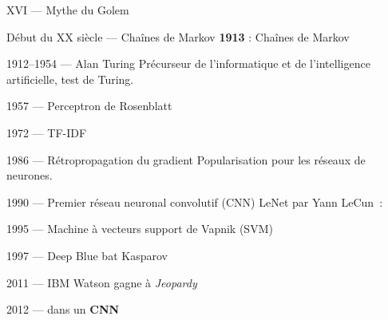 \begin{frame}{XVI\ieme{} --- Mythe du Golem}
\end{frame}

\begin{frame}{Début du XX\ieme{} siècle --- Chaînes de Markov}
  \textbf{1913} : Chaînes de Markov
\end{frame}

\begin{frame}{1912--1954 --- Alan Turing}
  Précurseur de l'informatique et de l'intelligence artificielle, test de Turing.

\end{frame}

\begin{frame}{1957 --- Perceptron de Rosenblatt}
\end{frame}

\begin{frame}{1972 --- TF-IDF}
\end{frame}

\begin{frame}{1986 --- Rétropropagation du gradient}
  Popularisation pour les réseaux de neurones.

\end{frame}

\begin{frame}{1990 --- Premier réseau neuronal convolutif (CNN)}
  LeNet par Yann LeCun~:
\end{frame}

\begin{frame}{1995 --- Machine à vecteurs support de Vapnik (SVM)}
\end{frame}

\begin{frame}{1997 --- Deep Blue bat Kasparov}
\end{frame}

\begin{frame}{2011 --- IBM Watson gagne à \textit{Jeopardy}}
\end{frame}

\begin{frame}{2012 ---  dans un \textbf{CNN}}
\end{frame}

